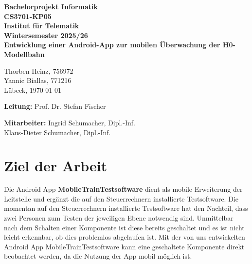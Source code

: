 \documentclass{article}
\begin{document}
\parindent0cm %

\thispagestyle{empty}


\begin{center}
\begin{Huge}
\textbf{Bachelorprojekt Informatik \\ \vspace{0.2cm}
CS3701-KP05\\ \vspace{2.5cm}
Institut für Telematik\\ \vspace{0.2cm}
Wintersemester 2025/26\\\vspace{2.5cm}
Entwicklung einer Android-App zur mobilen
Überwachung der H0-Modellbahn}\vspace{1.5cm}
\end{Huge}


\begin{huge}
Thorben Heinz, 756972 \\
Yannic Biallas, 771216 \\
Lübeck, \today 

\textbf{Leitung:} Prof. Dr. Stefan Fischer

\textbf{Mitarbeiter:} Ingrid Schumacher, Dipl.-Inf.\\
Klaus-Dieter Schumacher, Dipl.-Inf. 
\end{huge}

\end{center}


\setcounter{page}{0}

\newpage 
{} 


\tableofcontents 

\newpage


\setcounter{page}{0}

\section{Ziel der Arbeit}
Die Android App \textbf{MobileTrainTestsoftware} dient als mobile Erweiterung der Leitstelle und ergänzt die auf den Steuerrechnern installierte Testsoftware.
Die momentan auf den Steuerrechnern installierte Testsoftware hat den Nachteil, dass zwei Personen zum Testen der jeweiligen Ebene notwendig sind.
Unmittelbar nach dem Schalten einer Komponente ist diese bereits geschaltet und es ist nicht leicht erkennbar, ob dies problemlos abgelaufen ist.
Mit der von uns entwickelten Android App MobileTrainTestsoftware kann eine geschaltete Komponente direkt beobachtet werden, da die Nutzung der App mobil möglich ist.
\end{document}
